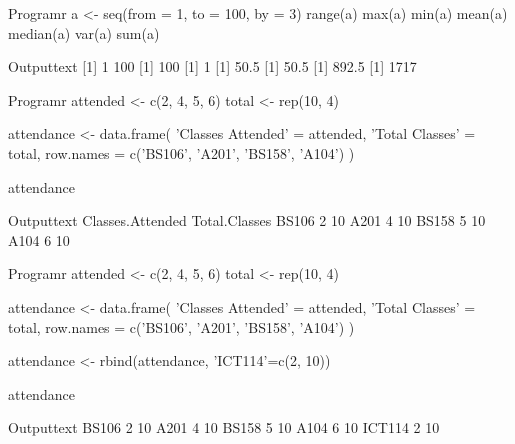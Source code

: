 \begin{code}
    {Program}{r}
a <- seq(from = 1, to = 100, by = 3)
range(a)
max(a)
min(a)
mean(a)
median(a)
var(a)
sum(a)
\end{code}
\begin{code}
    {Output}{text}
[1]   1 100
[1] 100
[1] 1
[1] 50.5
[1] 50.5
[1] 892.5
[1] 1717
\end{code}
\newpage

\begin{code}
    {Program}{r}
attended <- c(2, 4, 5, 6)
total <- rep(10, 4)

attendance <- data.frame(
  'Classes Attended' = attended, 'Total Classes' = total,
  row.names = c('BS106', 'A201', 'BS158', 'A104')
)

attendance
\end{code}
\begin{code}
    {Output}{text}
      Classes.Attended Total.Classes
BS106                2            10
A201                 4            10
BS158                5            10
A104                 6            10
\end{code}

\begin{code}
    {Program}{r}
attended <- c(2, 4, 5, 6)
total <- rep(10, 4)

attendance <- data.frame(
  'Classes Attended' = attended, 'Total Classes' = total,
  row.names = c('BS106', 'A201', 'BS158', 'A104')
)

attendance <- rbind(attendance, 'ICT114'=c(2, 10))

attendance
\end{code}
\begin{code}
    {Output}{text}
BS106                 2            10
A201                  4            10
BS158                 5            10
A104                  6            10
ICT114                2            10
\end{code}
